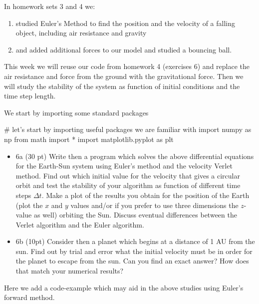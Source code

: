 \documentclass[%
oneside,                 %
final,                   %
10pt]{article}
\begin{document}
In homework sets 3 and 4 we:
\begin{enumerate}
\item studied  Euler's Method to find the position and the velocity of a falling object, including air resistance and gravity

\item and added additional forces to our model and studied a bouncing ball.
\end{enumerate}

\noindent
This week we will reuse our code from homework 4 (exercises 6)
and replace the air resistance and force from the ground with the
gravitational force. Then we will study the stability of the system as function of initial conditions and the time step length.

We start by importing some standard packages






\bpycod
# let's start by importing useful packages we are familiar with
import numpy as np
from math import *
import matplotlib.pyplot as plt

\epycod


\begin{itemize}
\item 6a (30 pt)  Write then a program which solves the above differential equations for the Earth-Sun system using Euler's  method and the velocity Verlet method.  Find out which initial value for the velocity that gives a circular orbit and test the stability of your algorithm as function of different time steps $\Delta t$.  Make a plot of the results you obtain for the position of the Earth (plot the $x$ and $y$ values and/or if you prefer to use three dimensions the $z$-value as well) orbiting  the Sun. Discuss eventual differences between the Verlet algorithm and the Euler algorithm. 

\item 6b (10pt) Consider then a planet which begins at a distance of 1 AU from the sun. Find out by trial and error what the initial velocity must be in order for the planet to escape from the sun.  Can you find an exact answer?  How does that match your numerical results?
\end{itemize}

\noindent
Here we add a code-example which may aid in the above studies using Euler's forward method.
\end{document}

